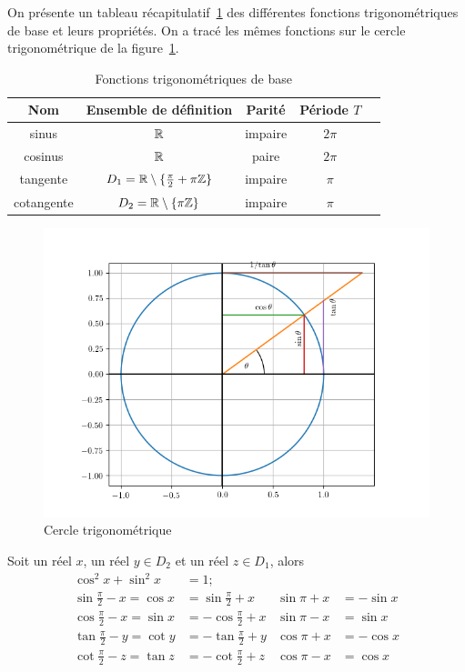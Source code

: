 On présente un tableau récapitulatif~\ref{tab:fonctiontrigo} des différentes
fonctions trigonométriques de base et leurs propriétés. On a tracé les mêmes
fonctions sur le cercle trigonométrique de la figure~\ref{fig:cercletrigo}.

\begin{table}
  \centering
  \begin{tabular}{ccccc}
    \toprule
    Nom & Ensemble de définition & Parité & Période \(T\) \\
    \midrule
    sinus & \(\mathbb{R}\) & impaire & \(2\pi\) \\
    cosinus & \(\mathbb{R}\) & paire & \(2\pi\) \\
    tangente & \(D_1 = \mathbb{R}\setminus\{\frac{\pi}{2}+\pi \mathbb{Z}\}\) & impaire &
    \(\pi\) \\
    cotangente & \(D_2 = \mathbb{R}\setminus\{\pi \mathbb{Z}\}\) & impaire & \(\pi\) \\
    \bottomrule
  \end{tabular}
  \caption{Fonctions trigonométriques de base}\label{tab:fonctiontrigo}
\end{table}

\begin{figure}
  \centering
  \includegraphics[scale = 0.8]{./CercleTrigo.png}
  \caption{Cercle trigonométrique}\label{fig:cercletrigo}
\end{figure}

Soit un réel \(x\), un réel \(y \in D_2\) et un réel \(z \in D_1\), alors
\begin{align*}
  \cos^2{x}+\sin^2{x} & = 1;\\
  \sin{\frac{\pi}{2}-x} = \cos{x}& = \sin{\frac{\pi}{2}+x} & \sin{\pi+x} &= -\sin{x}\\
  \cos{\frac{\pi}{2}-x} = \sin{x}& = -\cos{\frac{\pi}{2}+x} & \sin{\pi-x} &= \sin{x}\\
  \tan{\frac{\pi}{2}-y} = \cot{y}& = -\tan{\frac{\pi}{2}+y} & \cos{\pi+x} &= -\cos{x}\\
  \cot{\frac{\pi}{2}-z} = \tan{z}& = -\cot{\frac{\pi}{2}+z} & \cos{\pi-x} &= \cos{x}
\end{align*}


